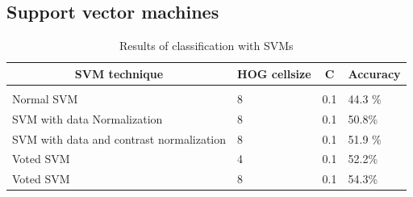 \documentclass{article} %
\begin{document}
\subsection{Support vector machines}
\begin{table}[t]
    \begin{center}
        \begin{tabular}{llll}
        \multicolumn{1}{c}{\bf SVM technique}  & \multicolumn{1}{c}{\bf HOG cellsize} & \multicolumn{1}{c}{\bf C} & \multicolumn{1}{c}{\bf Accuracy}
        \\ \hline \\
        Normal SVM &8 & 0.1        & 44.3 \% \\
        SVM with data Normalization   &8 & 0.1          & 50.8\% \\
        SVM with data and contrast normalization &8 & 0.1&51.9 \% \\
        Voted SVM	&4 & 0.1 & 52.2\% \\
        Voted SVM	&8 & 0.1 & 54.3\% \\
        \end{tabular}
    \end{center}
    \caption{Results of classification with SVMs}
    \label{tab:svm}
\end{table}
\end{document}
